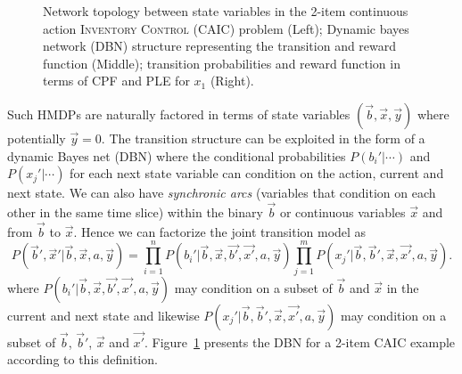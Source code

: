 \documentclass[twoside,11pt]{article}
\newcommand{\InventoryControl}{\textsc{Inventory Control }}
\begin{document}
\begin{figure}[t!]
\begin{subfigure}
        \end{subfigure}
        \vspace{-3mm}
\caption{\footnotesize Network topology between state variables in the 2-item continuous action \InventoryControl (CAIC) problem (Left); Dynamic bayes network (DBN) structure representing the transition and reward function (Middle); transition probabilities and reward function in terms of CPF and PLE for $x_1$ (Right). }
\label{fig:dbn}
\vspace{-3mm}
\end{figure}

Such HMDPs are naturally factored \cite{boutilier99dt}
in terms of state variables $(\vec{b},\vec{x},\vec{y})$ where potentially $\vec{y} =0$. The transition structure can be exploited in the form of a dynamic Bayes
net (DBN) \cite{dbn} where the conditional probabilities
$P(b_i'|\cdots)$ and $P(x_j'|\cdots)$ for each next state variable can
condition on the action, current and next state. 
We can also have \emph{synchronic arcs} (variables that condition on each
other in the same time slice) within the binary $\vec{b}$ or
continuous variables $\vec{x}$ and from $\vec{b}$ to $\vec{x}$.%
Hence we can factorize the joint transition model as
{%
\begin{equation}
P(\vec{b}',\vec{x}'|\vec{b},\vec{x},a,\vec{y}) = 
\prod_{i=1}^n P(b_i'|\vec{b},\vec{x},\vec{b'},\vec{x'},a,\vec{y}) \prod_{j=1}^m P(x_j'|\vec{b},\vec{b}',\vec{x},\vec{x'},a,\vec{y}). \nonumber 
\end{equation}}
where $P(b_i'|\vec{b},\vec{x},\vec{b'},\vec{x'},a,\vec{y})$ may condition on a subset of
$\vec{b}$ and $\vec{x}$ in the current and next state and likewise 
$P(x_j'|\vec{b},\vec{b}',\vec{x},\vec{x'},a,\vec{y})$ may condition on a subset of
$\vec{b}$, $\vec{b}'$, $\vec{x}$ and $\vec{x'}$. Figure~\ref{fig:dbn} presents the DBN for a 2-item CAIC example according to this definition.  
\end{document}
